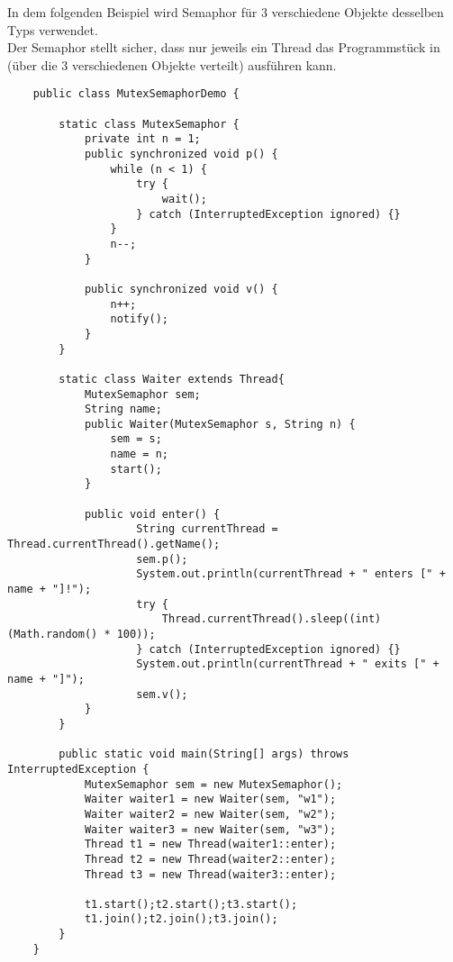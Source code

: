 \noindent
In dem folgenden Beispiel wird  Semaphor für 3 verschiedene Objekte desselben Typs verwendet.\\
Der Semaphor stellt sicher, dass nur jeweils ein Thread das Programmstück in  (über die $3$ verschiedenen Objekte verteilt) ausführen kann. \\

\newpage
\begin{verbatim}
    public class MutexSemaphorDemo {

        static class MutexSemaphor {
            private int n = 1;
            public synchronized void p() {
                while (n < 1) {
                    try {
                        wait();
                    } catch (InterruptedException ignored) {}
                }
                n--;
            }

            public synchronized void v() {
                n++;
                notify();
            }
        }

        static class Waiter extends Thread{
            MutexSemaphor sem;
            String name;
            public Waiter(MutexSemaphor s, String n) {
                sem = s;
                name = n;
                start();
            }

            public void enter() {
                    String currentThread = Thread.currentThread().getName();
                    sem.p();
                    System.out.println(currentThread + " enters [" + name + "]!");
                    try {
                        Thread.currentThread().sleep((int) (Math.random() * 100));
                    } catch (InterruptedException ignored) {}
                    System.out.println(currentThread + " exits [" + name + "]");
                    sem.v();
            }
        }

        public static void main(String[] args) throws InterruptedException {
            MutexSemaphor sem = new MutexSemaphor();
            Waiter waiter1 = new Waiter(sem, "w1");
            Waiter waiter2 = new Waiter(sem, "w2");
            Waiter waiter3 = new Waiter(sem, "w3");
            Thread t1 = new Thread(waiter1::enter);
            Thread t2 = new Thread(waiter2::enter);
            Thread t3 = new Thread(waiter3::enter);

            t1.start();t2.start();t3.start();
            t1.join();t2.join();t3.join();
        }
    }
\end{verbatim}\\

